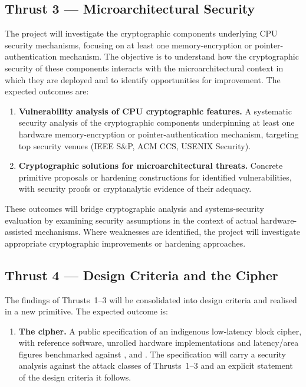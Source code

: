 \subsection*{Thrust 3 — Microarchitectural Security}
The project will investigate the cryptographic components underlying CPU security mechanisms, focusing on at least one memory-encryption or pointer-authentication mechanism.
The objective is to understand how the cryptographic security of these components interacts with the microarchitectural context in which they are deployed and to identify opportunities for improvement. The expected outcomes are:
\begin{enumerate}[label=\textbf{D\arabic*.}, leftmargin=*, itemsep=2pt, start=7]
  \item \textbf{Vulnerability analysis of CPU cryptographic features.}
        A systematic security analysis of the cryptographic components underpinning at least one hardware memory-encryption or pointer-authentication mechanism, targeting top security venues (IEEE S\&P, ACM CCS, USENIX Security).

  \item \textbf{Cryptographic solutions for microarchitectural threats.}
        Concrete primitive proposals or hardening constructions for identified vulnerabilities, with security proofs or cryptanalytic evidence of their adequacy.
\end{enumerate}

These outcomes will bridge cryptographic analysis and systems-security evaluation by examining security assumptions in the context of actual hardware-assisted mechanisms.
Where weaknesses are identified, the project will investigate appropriate cryptographic improvements or hardening approaches.

\subsection*{Thrust 4 — Design Criteria and the  Cipher}
The findings of Thrusts~1--3 will be consolidated into design criteria and realised in a new primitive. The expected outcome is:
\begin{enumerate}[label=\textbf{D\arabic*.}, leftmargin=*, itemsep=2pt, start=9]
  \item \textbf{The  cipher.}
        A public specification of an indigenous low-latency block cipher, with reference software, unrolled hardware implementations and latency/area figures benchmarked against ,  and .
        The specification will carry a security analysis against the attack classes of Thrusts~1--3 and an explicit statement of the design criteria it follows.
\end{enumerate}


